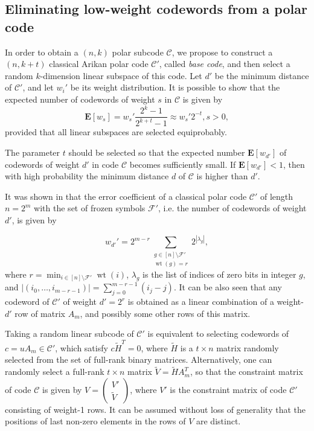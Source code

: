\documentclass[conference]{IEEEtran}
\DeclareMathOperator{\wt}{wt}
\theoremstyle{plain}
\newcommand{\mF}{\mathcal F}
\begin{document}
\subsection{Eliminating low-weight codewords from a polar code}
In order to obtain a $(n,k)$ polar subcode $\mathcal C$, we propose to construct a $(n,k+t)$ classical Arikan polar code $\mathcal C'$, called {\em base code}, and then select a random $k$-dimension linear subspace of this code.  Let $d'$ be the minimum distance of $\mathcal C'$, and let $w_i'$ be its weight distribution.  
It is possible to show \cite{Zubkov2014Probabilistic} that the expected number of codewords of weight $s$ in $\mathcal C$ is given by  
\begin{equation}
\label{mExpSpectrum}
\mathbf E[w_s]=w_s'\frac{2^k-1}{2^{k+t}-1}\approx w_s'2^{-t},s>0,
\end{equation}
provided that all  linear subspaces are selected equiprobably.

The parameter $t$ should be selected  so that the expected number $\mathbf E[w_{d'}]$ of codewords of weight $d'$ in code $\mathcal C$ becomes  sufficiently small. If $\mathbf E[w_{d'}]<1$, then with high probability  the minimum distance $d$ of $\mathcal C$ is higher than $d'$.


It was shown in \cite{bardet2016algebraic} that the error coefficient of a classical polar code $\mathcal C'$ of length $n=2^m$ with the set of frozen symbols $\mF'$, i.e. the number of codewords of weight $d'$, is given by 

\begin{equation}
\label{mPolarErrCoeff}
w_{d'}'=2^{m-r}\sum_{\substack{g\in [n]\setminus \mF'\\\wt(g)=r}}2^{|\lambda_g|},
\end{equation}
where $r=\min_{i\in [n]\setminus \mF'}\wt(i)$, $\lambda_g$ is the list of indices of zero bits in integer $g$, and $|(i_{0},\dots,i_{m-r-1})|=\sum_{j=0}^{m-r-1}(i_j-j)$.
It can be also seen that any  codeword of $\mathcal C'$ of weight $d'=2^r$ is obtained as a linear combination of a weight-$d'$ row of matrix $A_m$, and possibly some other rows of this matrix.

Taking a random linear subcode of $\mathcal C'$ is equivalent to selecting codewords of $c=uA_m\in \mathcal C'$, which satisfy $c\tilde H^T=0$, where $\tilde H$ is a $t\times n$ matrix randomly selected from the set of full-rank binary matrices.  Alternatively, one can randomly select a full-rank $t\times n$ matrix  $\tilde V=\tilde H A_m^T$, so that the constraint matrix of code $\mathcal C$ is given by $V=\begin{pmatrix}V'\\\tilde V\end{pmatrix}$, where $V'$ is the constraint matrix of code $\mathcal C'$ consisting of weight-1 rows. It can be assumed without loss of generality that the positions of last non-zero elements in the rows of $V$ are distinct. 
\end{document}
